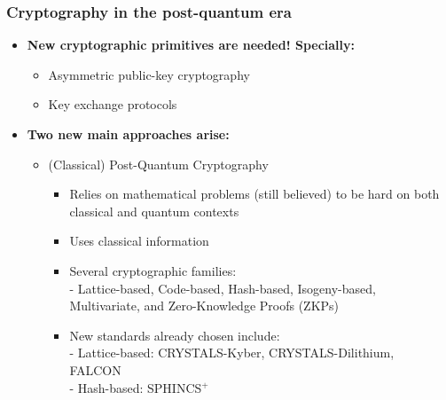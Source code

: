 \documentclass{beamer}
\begin{document}
        \begin{frame}
			\frametitle{\LARGE Cryptography in the post-quantum era}

            \vspace{2.5ex}
			\begin{itemize}
                \item \textbf{New cryptographic primitives are needed! Specially:}
                \begin{itemize}
                    \item Asymmetric public-key cryptography
                    \item Key exchange protocols
                \end{itemize}
                \item \textbf{Two new main approaches arise:}
                \begin{itemize}
                    \item (Classical) Post-Quantum Cryptography
                    \begin{itemize}
                        \item Relies on mathematical problems (still believed) to be hard on both classical and quantum contexts
                        \item Uses classical information
                        \item Several cryptographic families:\\
                        - Lattice-based, Code-based, Hash-based, Isogeny-based,\\\hspace{0.5em}Multivariate, and Zero-Knowledge Proofs (ZKPs)
                        \item New standards already chosen include:\\
                        - Lattice-based: CRYSTALS-Kyber, CRYSTALS-Dilithium,\\ \hspace{6.75em}FALCON\\
                        - Hash-based: SPHINCS${}^{+}$
                    \end{itemize}
                \end{itemize}
            \end{itemize}
		\end{frame}
\end{document}
